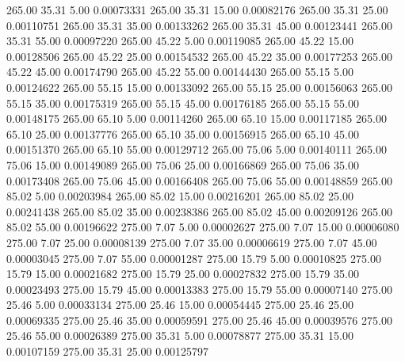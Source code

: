     265.00     35.31      5.00     0.00073331
    265.00     35.31     15.00     0.00082176
    265.00     35.31     25.00     0.00110751
    265.00     35.31     35.00     0.00133262
    265.00     35.31     45.00     0.00123441
    265.00     35.31     55.00     0.00097220
    265.00     45.22      5.00     0.00119085
    265.00     45.22     15.00     0.00128506
    265.00     45.22     25.00     0.00154532
    265.00     45.22     35.00     0.00177253
    265.00     45.22     45.00     0.00174790
    265.00     45.22     55.00     0.00144430
    265.00     55.15      5.00     0.00124622
    265.00     55.15     15.00     0.00133092
    265.00     55.15     25.00     0.00156063
    265.00     55.15     35.00     0.00175319
    265.00     55.15     45.00     0.00176185
    265.00     55.15     55.00     0.00148175
    265.00     65.10      5.00     0.00114260
    265.00     65.10     15.00     0.00117185
    265.00     65.10     25.00     0.00137776
    265.00     65.10     35.00     0.00156915
    265.00     65.10     45.00     0.00151370
    265.00     65.10     55.00     0.00129712
    265.00     75.06      5.00     0.00140111
    265.00     75.06     15.00     0.00149089
    265.00     75.06     25.00     0.00166869
    265.00     75.06     35.00     0.00173408
    265.00     75.06     45.00     0.00166408
    265.00     75.06     55.00     0.00148859
    265.00     85.02      5.00     0.00203984
    265.00     85.02     15.00     0.00216201
    265.00     85.02     25.00     0.00241438
    265.00     85.02     35.00     0.00238386
    265.00     85.02     45.00     0.00209126
    265.00     85.02     55.00     0.00196622
    275.00      7.07      5.00     0.00002627
    275.00      7.07     15.00     0.00006080
    275.00      7.07     25.00     0.00008139
    275.00      7.07     35.00     0.00006619
    275.00      7.07     45.00     0.00003045
    275.00      7.07     55.00     0.00001287
    275.00     15.79      5.00     0.00010825
    275.00     15.79     15.00     0.00021682
    275.00     15.79     25.00     0.00027832
    275.00     15.79     35.00     0.00023493
    275.00     15.79     45.00     0.00013383
    275.00     15.79     55.00     0.00007140
    275.00     25.46      5.00     0.00033134
    275.00     25.46     15.00     0.00054445
    275.00     25.46     25.00     0.00069335
    275.00     25.46     35.00     0.00059591
    275.00     25.46     45.00     0.00039576
    275.00     25.46     55.00     0.00026389
    275.00     35.31      5.00     0.00078877
    275.00     35.31     15.00     0.00107159
    275.00     35.31     25.00     0.00125797
